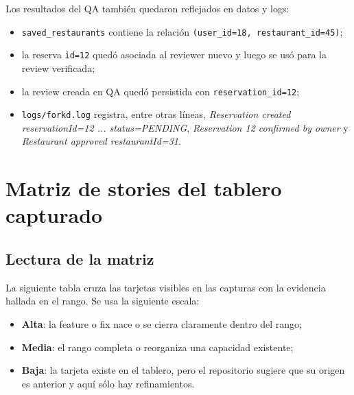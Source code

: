 \documentclass[11pt,a4paper]{report}
\newcommand{\code}[1]{\nolinkurl{#1}}
\newcommand{\confidence}[1]{\textbf{#1}}
\begin{document}
Los resultados del QA tambi\'en quedaron reflejados en datos y logs:

\begin{itemize}
  \item \code{saved\_restaurants} contiene la relaci\'on \code{(user\_id=18, restaurant\_id=45)};
  \item la reserva \code{id=12} qued\'o asociada al reviewer nuevo y luego se us\'o para la review verificada;
  \item la review creada en QA qued\'o persistida con \code{reservation\_id=12};
  \item \code{logs/forkd.log} registra, entre otras l\'ineas, \emph{Reservation created reservationId=12 ... status=PENDING}, \emph{Reservation 12 confirmed by owner} y \emph{Restaurant approved restaurantId=31}.
\end{itemize}

\chapter{Matriz de stories del tablero capturado}

\section{Lectura de la matriz}

La siguiente tabla cruza las tarjetas visibles en las capturas con la evidencia hallada en el rango. Se usa la siguiente escala:

\begin{itemize}
  \item \confidence{Alta}: la feature o fix nace o se cierra claramente dentro del rango;
  \item \confidence{Media}: el rango completa o reorganiza una capacidad existente;
  \item \confidence{Baja}: la tarjeta existe en el tablero, pero el repositorio sugiere que su origen es anterior y aqu\'i s\'olo hay refinamientos.
\end{itemize}
\end{document}
